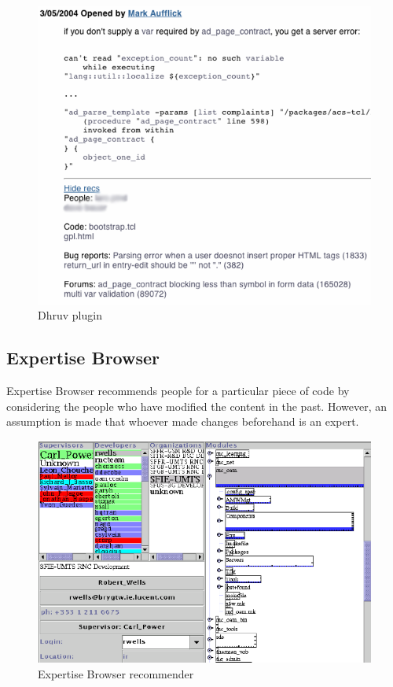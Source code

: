 \documentclass{l4proj}
\begin{document}
\begin{figure}[H]
\includegraphics[scale=0.45]{dhruv}
\centering
\caption{Dhruv plugin}\label{dhruv}
\label{fig:dhruv}
\end{figure}

\subsection{Expertise Browser}
Expertise Browser recommends people for a particular piece of code by considering the people who have modified the content in the past. However, an assumption is made that whoever made changes beforehand is an expert.

\begin{figure}[H]
\includegraphics[scale=0.4]{expertise}
\centering
\caption{Expertise Browser recommender}\label{expertise}
\label{fig:expertise}
\end{figure}
\end{document}
